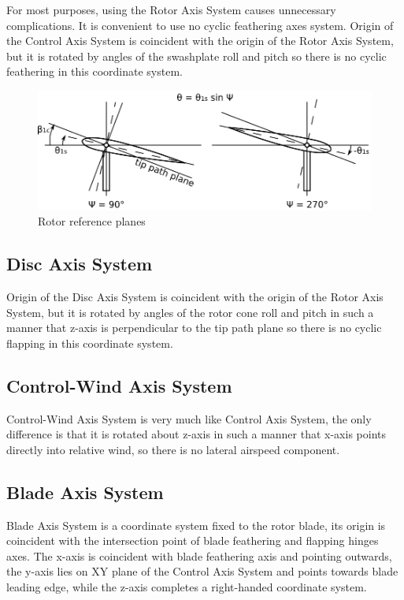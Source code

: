 For most purposes, using the Rotor Axis System causes unnecessary complications. It is convenient to use no cyclic feathering axes system. \cite{GessowMyers1985} Origin of the Control Axis System is coincident with the origin of the Rotor Axis System, but it is rotated by angles of the swashplate roll and pitch so there is no cyclic feathering in this coordinate system.

\begin{figure}[h!]
  \centering
  \includegraphics[width=120mm]{images/rotor_planes.eps}
  \caption{Rotor reference planes}
\end{figure}

\subsection{Disc Axis System}

Origin of the Disc Axis System is coincident with the origin of the Rotor Axis System, but it is rotated by angles of the rotor cone roll and pitch in such a manner that z-axis is perpendicular to the tip path plane so there is no cyclic flapping in this coordinate system.

\subsection{Control-Wind Axis System}

Control-Wind Axis System is very much like Control Axis System, the only difference is that it is rotated about z-axis in such a manner that x-axis points directly into relative wind, so there is no lateral airspeed component.

\subsection{Blade Axis System}

Blade Axis System is a coordinate system fixed to the rotor blade, its origin is coincident with the intersection point of blade feathering and flapping hinges axes. The x-axis is coincident with blade feathering axis and pointing outwards, the y-axis lies on XY plane of the Control Axis System and points towards blade leading edge, while the z-axis completes a right-handed coordinate system.

